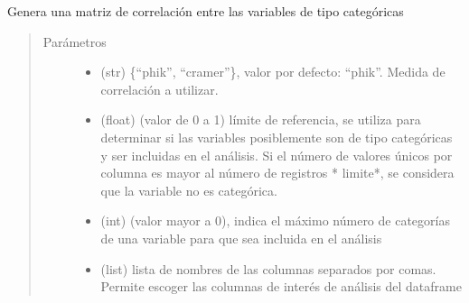 \documentclass[letterpaper,10pt,openany,spanish]{sphinxmanual}
\begin{document}
\begin{fulllineitems}
\begin{fulllineitems}
\end{fulllineitems}


\begin{fulllineitems}
\label{\detokenize{calidad_datos:calidad_datos.CalidadDatos.CorrelacionCategoricas}}
Genera una matriz de correlación entre las variables de tipo categóricas
\begin{quote}\begin{description}
\item[{Parámetros}] \leavevmode\begin{itemize}
\item {} 
 \textendash{} (str) \{“phik”, “cramer”\}, valor por             defecto: “phik”. Medida de correlación a utilizar.

\item {} 
 \textendash{} (float) (valor de 0 a 1) límite de referencia, se             utiliza para determinar si las variables posiblemente son de tipo             categóricas y ser incluidas en el análisis. Si el número de             valores únicos por columna es mayor al número de registros             * limite*, se considera que la variable no es categórica.

\item {} 
 \textendash{} (int) (valor mayor a 0), indica el máximo             número de categorías de una variable para que sea incluida en el             análisis

\item {} 
 \textendash{} (list) lista de nombres de las columnas separados             por comas. Permite escoger las columnas de interés de análisis             del dataframe

\end{itemize}


\end{description}
\end{quote}
\end{fulllineitems}
\end{fulllineitems}
\end{document}
